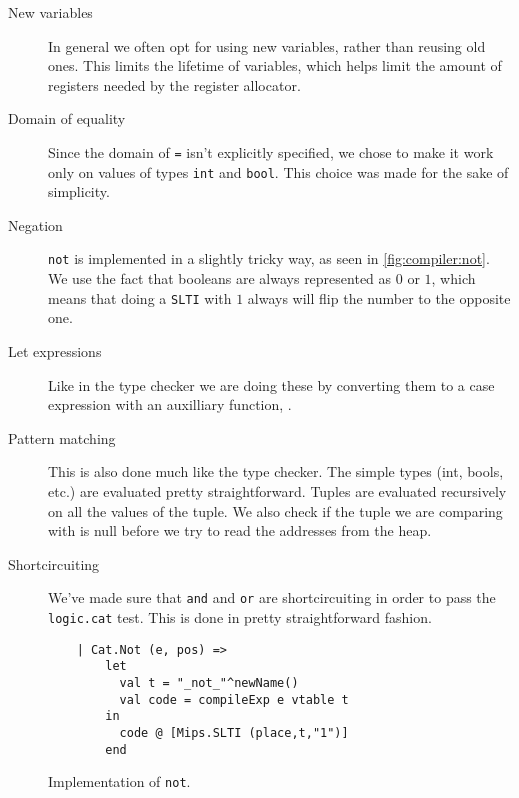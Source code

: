 \begin{description}
\item [New variables] In general we often opt for using new variables, rather
        than reusing old ones. This limits the lifetime of variables, which
        helps limit the amount of registers needed by the register allocator.

\item [Domain of equality] Since the domain of \texttt{=} isn't explicitly
        specified, we chose to make it work only on values of types
        \texttt{int} and \texttt{bool}. This choice was made for the sake of
        simplicity.

\item [Negation] \texttt{not} is implemented in a slightly tricky way, as seen
        in \autoref{fig:compiler:not}. We use the fact that booleans are always
        represented as $0$ or $1$, which means that doing a \texttt{SLTI} with
        $1$ always will flip the number to the opposite one.

\item [Let expressions] Like in the type checker we are doing these by
        converting them to a case expression with an auxilliary function,
        .

\item [Pattern matching] This is also done much like the type checker. The
        simple types (int, bools, etc.) are evaluated pretty straightforward.
        Tuples are evaluated recursively on all the values of the tuple. We
        also check if the tuple we are comparing with is null before we try to
        read the addresses from the heap.

\item [Shortcircuiting] We've made sure that \texttt{and} and \texttt{or} are
        shortcircuiting in order to pass the \texttt{logic.cat} test. This is
        done in pretty straightforward fashion.
\end{description}

\begin{figure}
    \centering
    \begin{lstlisting}
    | Cat.Not (e, pos) =>
        let
          val t = "_not_"^newName()
          val code = compileExp e vtable t
        in
          code @ [Mips.SLTI (place,t,"1")]
        end
    \end{lstlisting}
    \caption{Implementation of \texttt{not}.}
    \label{fig:compiler:not}
\end{figure}


